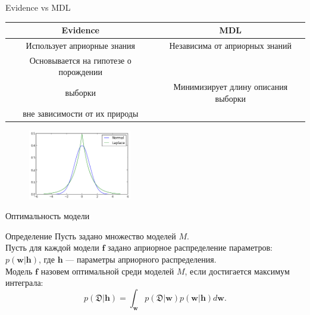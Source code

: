 \documentclass[usenames,dvipsnames,10pt,pdf,utf8,russian,aspectratio=43]{beamer}
\begin{document}
\begin{frame}{Evidence vs MDL}
\small
\begin{tabular}{ c | c  }
  \hline			
 \bf Evidence & \bf MDL \\
  \hline  
Использует априорные знания &  Независима от априорных знаний \\
  \hline  
Основывается на гипотезе о порождении\\ выборки & Минимизирует длину описания выборки\\ вне зависимости от их природы \\
  \hline  

\end{tabular}


\begin{figure}
  \centering
 \includegraphics[width=0.4\textwidth]{laplace.png}
\label{fig:1}\qquad

\end{figure}


\end{frame}




\begin{frame}{Оптимальность модели}
\begin{block}{Определение}
Пусть задано множество моделей $M$.  \\
Пусть для каждой модели $\mathbf{f}$ задано априорное распределение параметров: $p(\mathbf{w}|\mathbf{h})$, где $\mathbf{h}$ --- параметры априорного распределения.\\
Модель $\mathbf{f}$ назовем оптимальной среди моделей ${M}$, если достигается максимум интеграла:
\[
	p(\mathfrak{D}|\mathbf{h}) = \int_\mathbf{w} p(\mathfrak{D}|\mathbf{w})p(\mathbf{w}|\mathbf{h}) d\mathbf{w}.
\]
\end{block}
\end{frame}
\end{document}
